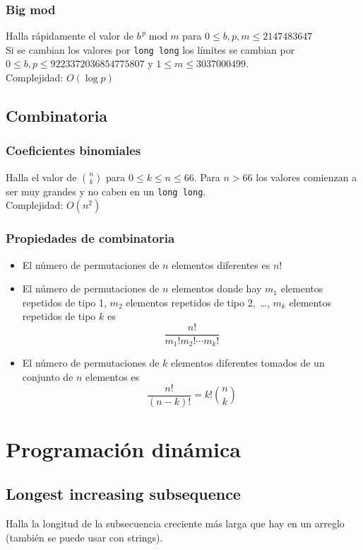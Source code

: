 \documentclass[10pt,letterpaper,twocolumn]{article}
\newcommand{\source}[1]{
	
	\dotfill
}
\begin{document}
		\subsubsection{Big mod}
		Halla rápidamente el valor de $b^{\,p} \operatorname{mod} m$ para $0 \leq b,p,m \leq 2147483647$\\
		Si se cambian los valores por \verb|long long| los límites se cambian por $0 \leq b,p \leq 9223372036854775807$ y $1 \leq m \leq 3037000499$.\\
		Complejidad: $O(\operatorname{log} p)$\\
		\source{./src/bigmod.cpp}

	\subsection{Combinatoria}
		\subsubsection{Coeficientes binomiales}
		Halla el valor de $\binom{n}{k}$ para $0 \leq k \leq n \leq 66$. Para $n > 66$ los valores comienzan a ser muy grandes y no caben en un \verb|long long|.\\
		Complejidad: $O(n^2)$\\
		\source{./src/binomial.cpp}

		\subsubsection{Propiedades de combinatoria}
		\begin{itemize}
			\item El número de permutaciones de $n$ elementos diferentes es $n!$
			\item El número de permutaciones de $n$ elementos donde hay $m_1$ elementos repetidos de tipo 1, $m_2$ elementos repetidos de tipo 2,~\ldots, $m_k$ elementos repetidos de tipo $k$ es $$\frac{n!}{m_1! m_2! \cdots m_k!} $$
			\item El número de permutaciones de $k$ elementos diferentes tomados de un conjunto de $n$ elementos es $$ \frac{n!}{(n-k)!} = k! \binom{n}{k}$$
		\end{itemize}



\section{Programación dinámica}
	\subsection{Longest increasing subsequence}
		Halla la longitud de la subsecuencia creciente más larga que hay en un arreglo (también se puede usar con strings).
\end{document}
